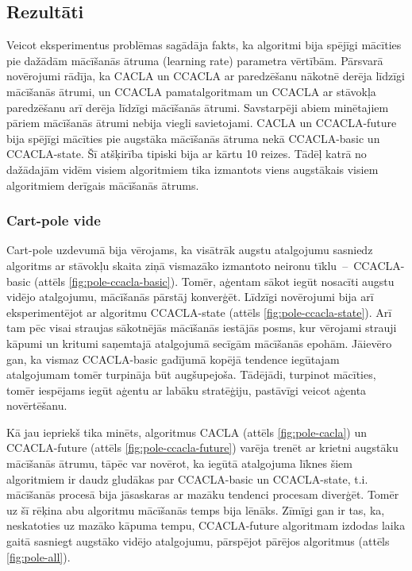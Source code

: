 \documentclass{ludis} %
\begin{document}
\subsection{Rezultāti}
Veicot eksperimentus problēmas sagādāja fakts, ka algoritmi bija spējīgi
mācīties pie dažādām mācīšanās ātruma (learning rate) parametra vērtībām.
Pārsvarā novērojumi rādīja, ka CACLA un CCACLA ar paredzēšanu nākotnē derēja
līdzīgi mācīšanās ātrumi, un CCACLA pamatalgoritmam un CCACLA ar stāvokļa
paredzēšanu arī derēja līdzīgi mācīšanās ātrumi. Savstarpēji abiem minētajiem
pāriem mācīšanās ātrumi nebija viegli savietojami. CACLA un CCACLA-future bija
spējīgi mācīties pie augstāka mācīšanās ātruma nekā CCACLA-basic un
CCACLA-state. Šī atšķirība tipiski bija ar kārtu 10 reizes. Tādēļ katrā no
dažādajām vidēm visiem algoritmiem tika izmantots viens augstākais visiem
algoritmiem derīgais mācīšanās ātrums.

\subsubsection{Cart-pole vide}
Cart-pole uzdevumā bija vērojams, ka visātrāk augstu atalgojumu sasniedz
algoritms ar stāvokļu skaita ziņā vismazāko izmantoto neironu
tīklu~--~CCACLA-basic (attēls \ref{fig:pole-ccacla-basic}). Tomēr, aģentam sākot
iegūt nosacīti augstu vidējo atalgojumu, mācīšanās pārstāj konverģēt. Līdzīgi
novērojumi bija arī eksperimentējot ar algoritmu CCACLA-state (attēls
\ref{fig:pole-ccacla-state}). Arī tam pēc visai straujas sākotnējās mācīšanās
iestājās posms, kur vērojami strauji kāpumi un kritumi saņemtajā atalgojumā
secīgām mācīšanās epohām. Jāievēro gan, ka vismaz CCACLA-basic gadījumā kopējā
tendence iegūtajam atalgojumam tomēr turpināja būt augšupejoša. Tādējādi,
turpinot mācīties, tomēr iespējams iegūt aģentu ar labāku stratēģiju, pastāvīgi
veicot aģenta novērtēšanu.

Kā jau iepriekš tika minēts, algoritmus CACLA (attēls \ref{fig:pole-cacla}) un
CCACLA-future (attēls \ref{fig:pole-ccacla-future}) varēja trenēt ar krietni
augstāku mācīšanās ātrumu, tāpēc var novērot, ka iegūtā atalgojuma līknes šiem
algoritmiem ir daudz gludākas par CCACLA-basic un CCACLA-state, t.i. mācīšanās
procesā bija jāsaskaras ar mazāku tendenci procesam diverģēt. Tomēr uz šī rēķina
abu algoritmu mācīšanās temps bija lēnāks. Zīmīgi gan ir tas, ka, neskatoties uz
mazāko kāpuma tempu, CCACLA-future algoritmam izdodas laika gaitā sasniegt
augstāko vidējo atalgojumu, pārspējot pārējos algoritmus (attēls
\ref{fig:pole-all}).
\end{document}
